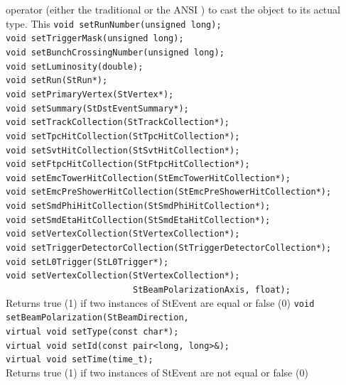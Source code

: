     operator (either the traditional \name{()} or the ANSI
    ) to cast the object to its actual type. This
    \verb+void setRunNumber(unsigned long);+\\                
    \verb+void setTriggerMask(unsigned long);+\\              
    \verb+void setBunchCrossingNumber(unsigned long);+\\      
    \verb+void setLuminosity(double);+\\               
    \verb+void setRun(StRun*);+\\                            
    \verb+void setPrimaryVertex(StVertex*);+\\                  
    \verb+void setSummary(StDstEventSummary*);+\\                        
    \verb+void setTrackCollection(StTrackCollection*);+\\                
    \verb+void setTpcHitCollection(StTpcHitCollection*);+\\               
    \verb+void setSvtHitCollection(StSvtHitCollection*);+\\               
    \verb+void setFtpcHitCollection(StFtpcHitCollection*);+\\              
    \verb+void setEmcTowerHitCollection(StEmcTowerHitCollection*);+\\              
    \verb+void setEmcPreShowerHitCollection(StEmcPreShowerHitCollection*);+\\              
    \verb+void setSmdPhiHitCollection(StSmdPhiHitCollection*);+\\              
    \verb+void setSmdEtaHitCollection(StSmdEtaHitCollection*);+\\              
    \verb+void setVertexCollection(StVertexCollection*);+\\               
    \verb+void setTriggerDetectorCollection(StTriggerDetectorCollection*);+\\      
    \verb+void setL0Trigger(StL0Trigger*);+\\                      
    \verb+void setVertexCollection(StVertexCollection*);+\\
    \verb+                         StBeamPolarizationAxis, float);+\\                   
    Returns true (1) if two instances of StEvent are equal or false (0)
    \verb+void setBeamPolarization(StBeamDirection, +\\
    \verb+virtual void setType(const char*);+\\
    \verb+virtual void setId(const pair<long, long>&);+\\
    \verb+virtual void setTime(time_t);+\\
    Returns true (1) if two instances of StEvent are not equal or false (0)
    
